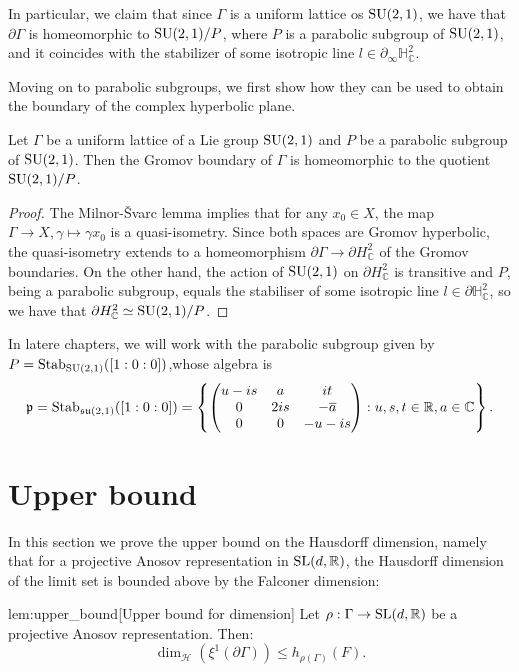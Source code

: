 \documentclass{report}
\begin{document}
In particular, we claim that since $\Gamma$ is a uniform lattice os $\operatorname{{\mathrm{SU}}}(2,1)$, we have that $\partial \Gamma$ is homeomorphic to $\operatorname{{\mathrm{SU}}}(2,1)/P$, where $P$ is a parabolic subgroup of $\operatorname{{\mathrm{SU}}}(2,1)$, and it coincides with the stabilizer of some isotropic line $l \in \partial_\infty \mathbb H^2_\mathbb C$.

Moving on to parabolic subgroups, we first show how they can be used to obtain the boundary of the complex hyperbolic plane.
\begin{lemma}\label{lem:lattice_boundary}
    Let $\Gamma$ be a uniform lattice of a Lie group $\operatorname{{\mathrm{SU}}}(2,1)$ and $P$ be a parabolic subgroup of $\operatorname{{\mathrm{SU}}}(2,1)$.
    Then the Gromov boundary of $\Gamma$ is homeomorphic to the quotient $\operatorname{{\mathrm{SU}}}(2,1)/P$.  
\end{lemma}
\begin{proof}
    The Milnor-Švarc lemma implies that for any $x_0 \in X$, the map $\Gamma \to X, \gamma \mapsto \gamma x_0$ is a quasi-isometry.
    Since both spaces are Gromov hyperbolic, the quasi-isometry extends to a homeomorphism $\partial \Gamma \to \partial H^2_{\mathbb C}$ of the Gromov boundaries.
    On the other hand, the action of $\operatorname{{\mathrm{SU}}}(2,1)$ on $\partial H^2_\mathbb C$ is transitive and $P$, being a parabolic subgroup, equals the stabiliser of some isotropic line $l \in \partial \mathbb H^2_{\mathbb C}$, so we have that $\partial H^2_{\mathbb C} \simeq \operatorname{{\mathrm{SU}}}(2,1)/P$.
\end{proof}
In latere chapters, we will work with the parabolic subgroup given by $P = \operatorname{Stab}_{\operatorname{{\mathrm{SU}}}(2,1)}([1:0:0])$,whose algebra is
\[
\mathfrak p = \operatorname{Stab}_{\operatorname{{\mathfrak{su}}}(2,1)}([1:0:0]) = \left\{
    \begin{pmatrix}
        u - is & a & it\\
        0 & 2is & -\overline{a}\\
        0 & 0 & -u - is
    \end{pmatrix} : u,s,t \in \mathbb R, a \in \mathbb C
\right\}.
\]
\chapter{Upper bound}\label{ch:upper_bound}
In this section we prove the upper bound on the Hausdorff dimension, namely that for a projective Anosov representation in $\operatorname{{\mathrm{SL}}}(d, \mathbb R)$, the Hausdorff dimension of the limit set is bounded above by the Falconer dimension:
\begin{replemma}{lem:upper_bound}[Upper bound for dimension]
    Let $\rho: \Gamma \to \operatorname{{\mathrm{SL}}}(d, \mathbb R)$ be a projective Anosov representation. 
    Then:
    \[
        \dim_{\mathcal H}(\xi^1 (\partial \Gamma) ) \leq h_{\rho(\Gamma)}(F).
    \]
\end{replemma}
    
\end{document}
